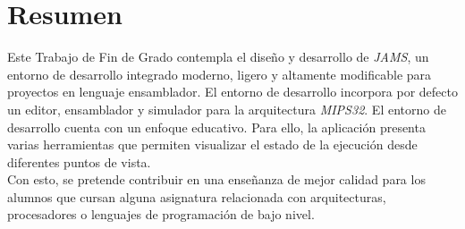 \chapter{Resumen} \label{ch:resumen}

Este Trabajo de Fin de Grado contempla el diseño y desarrollo de \textit{JAMS},
un entorno de desarrollo integrado moderno, ligero y altamente modificable
para proyectos en lenguaje ensamblador.
El entorno de desarrollo incorpora por defecto un editor, ensamblador y simulador
para la arquitectura \textit{MIPS32}.
El entorno de desarrollo cuenta con un enfoque educativo.
Para ello, la aplicación presenta varias herramientas que permiten
visualizar el estado de la ejecución desde diferentes puntos de vista.\\
Con esto, se pretende contribuir en una enseñanza de mejor calidad para
los alumnos que cursan alguna asignatura relacionada con arquitecturas,
procesadores o lenguajes de programación de bajo nivel.